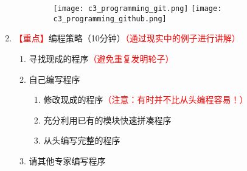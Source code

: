 \documentclass{TIJMUjiaoanLL}
\begin{document}
\begin{enumerate}
\begin{enumerate}
\vspace*{-1em}
\begin{figure}[h]
  \texttt{[image: c3\_programming\_git.png]}
  \texttt{[image: c3\_programming\_github.png]}
\end{figure}
    \end{enumerate}
  \item \textcolor{red}{【重点】}编程策略（10分钟）\textcolor{red}{（通过现实中的例子进行讲解）}
    \begin{enumerate}
      \item 寻找现成的程序\textcolor{red}{（避免重复发明轮子）}
      \item 自己编写程序
	\begin{enumerate}
	  \item 修改现成的程序\textcolor{red}{（注意：有时并不比从头编程容易！）}
	  \item 充分利用已有的模块快速拼凑程序
	  \item 从头编写完整的程序
	\end{enumerate}
      \item 请其他专家编写程序
    \end{enumerate}

\otherTail
\newpage
\otherHeader


\end{enumerate}
\end{document}
